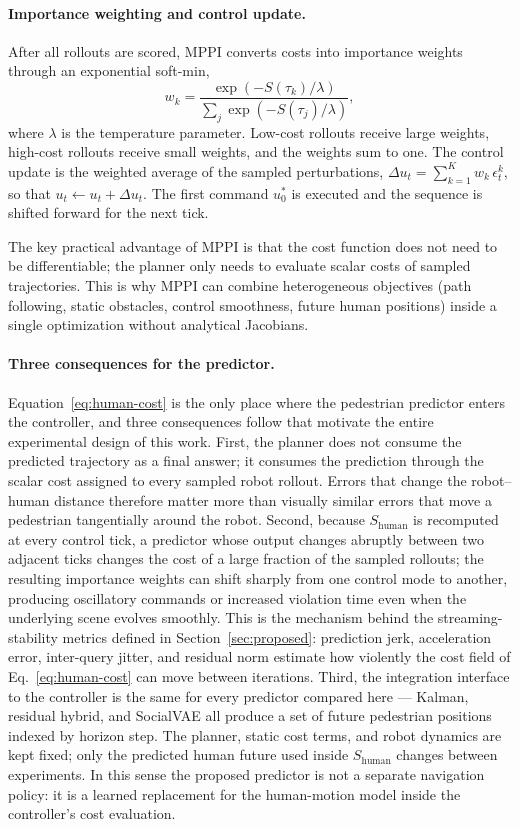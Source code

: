 \documentclass[12pt, a4paper]{article}
\begin{document}
\paragraph{Importance weighting and control update.} After all rollouts are scored, MPPI converts costs into importance weights through an exponential soft-min,
\[
w_k = \frac{\exp(-S(\tau_k) / \lambda)}{\sum_j \exp(-S(\tau_j) / \lambda)},
\]
where $\lambda$ is the temperature parameter. Low-cost rollouts receive large weights, high-cost rollouts receive small weights, and the weights sum to one. The control update is the weighted average of the sampled perturbations, $\Delta u_t = \sum_{k=1}^{K} w_k\,\epsilon^k_t$, so that $u_t \leftarrow u_t + \Delta u_t$. The first command $u_0^{*}$ is executed and the sequence is shifted forward for the next tick.

The key practical advantage of MPPI is that the cost function does not need to be differentiable; the planner only needs to evaluate scalar costs of sampled trajectories. This is why MPPI can combine heterogeneous objectives (path following, static obstacles, control smoothness, future human positions) inside a single optimization without analytical Jacobians.

\paragraph{Three consequences for the predictor.} Equation~\eqref{eq:human-cost} is the only place where the pedestrian predictor enters the controller, and three consequences follow that motivate the entire experimental design of this work. First, the planner does not consume the predicted trajectory as a final answer; it consumes the prediction through the scalar cost assigned to every sampled robot rollout. Errors that change the robot--human distance therefore matter more than visually similar errors that move a pedestrian tangentially around the robot. Second, because $S_{\mathrm{human}}$ is recomputed at every control tick, a predictor whose output changes abruptly between two adjacent ticks changes the cost of a large fraction of the sampled rollouts; the resulting importance weights can shift sharply from one control mode to another, producing oscillatory commands or increased violation time even when the underlying scene evolves smoothly. This is the mechanism behind the streaming-stability metrics defined in Section~\ref{sec:proposed}: prediction jerk, acceleration error, inter-query jitter, and residual norm estimate how violently the cost field of Eq.~\eqref{eq:human-cost} can move between iterations. Third, the integration interface to the controller is the same for every predictor compared here --- Kalman, residual hybrid, and SocialVAE all produce a set of future pedestrian positions indexed by horizon step. The planner, static cost terms, and robot dynamics are kept fixed; only the predicted human future used inside $S_{\mathrm{human}}$ changes between experiments. In this sense the proposed predictor is not a separate navigation policy: it is a learned replacement for the human-motion model inside the controller's cost evaluation.
\end{document}
